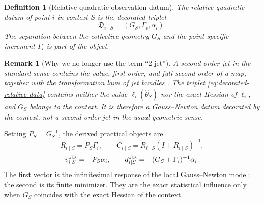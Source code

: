 \documentclass[10pt,a4paper]{article}
\newtheorem{definition}[theorem]{Definition}
\newtheorem{remark}[theorem]{Remark}
\newcommand{\Jreg}{\mathfrak D}
\begin{document}
\begin{definition}[Relative quadratic observation datum]
The \emph{relative quadratic datum} of point $i$ in context $S$ is the decorated triplet
\begin{equation}
\boxed{\Jreg_{i\mid S}=(G_S,\Gamma_i,\alpha_i).}
\label{eq:decorated-relative-data}
\end{equation}
The separation between the collective geometry $G_S$ and the point-specific increment $\Gamma_i$ is part of the object.
\end{definition}

\begin{remark}[Why we no longer use the term ``2-jet'']
A second-order jet in the standard sense contains the value, first order, and full second order of a map, together with the transformation laws of jet bundles \citep{saunders1989}. The triplet \eqref{eq:decorated-relative-data} contains neither the value $\ell_i(\widehat\theta_S)$ nor the exact Hessian of $\ell_i$, and $G_S$ belongs to the context. It is therefore a Gauss--Newton datum decorated by the context, not a second-order jet in the usual geometric sense.
\end{remark}

Setting $P_S=G_S^{-1}$, the derived practical objects are
\begin{equation}
R_{i\mid S}=P_S\Gamma_i,
\qquad
C_{i\mid S}=R_{i\mid S}(I+R_{i\mid S})^{-1},
\label{eq:R-C}
\end{equation}
\begin{equation}
v_{i\mid S}^{\rm obs}=-P_S\alpha_i,
\qquad
d_{i\mid S}^{\rm obs}=-(G_S+\Gamma_i)^{-1}\alpha_i.
\label{eq:v-d}
\end{equation}
The first vector is the infinitesimal response of the local Gauss--Newton model; the second is its finite minimizer. They are the exact statistical influence only when $G_S$ coincides with the exact Hessian of the context.
\end{document}
